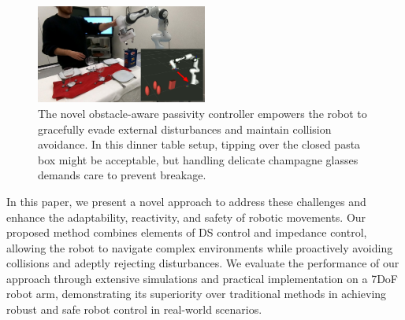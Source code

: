 \begin{figure}
\centerline{\includegraphics[width=0.5\textwidth]{figures/robot_arm_table_avoidance}}
\caption{
The novel obstacle-aware passivity controller empowers the robot to gracefully evade external disturbances and maintain collision avoidance. 
In this dinner table setup, tipping over the closed pasta box might be acceptable, but handling delicate champagne glasses demands care to prevent breakage.
}
\label{fig:table_avoidance_with_obstacle}
\end{figure}


In this paper, we present a novel approach to address these challenges and enhance the adaptability, reactivity, and safety of robotic movements. Our proposed method combines elements of DS control and impedance control, allowing the robot to navigate complex environments while proactively avoiding collisions and adeptly rejecting disturbances. We evaluate the performance of our approach through extensive simulations and practical implementation on a 7DoF robot arm, demonstrating its superiority over traditional methods in achieving robust and safe robot control in real-world scenarios.


